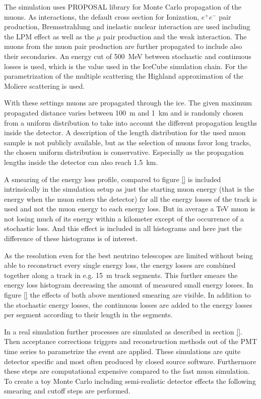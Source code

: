 The simulation uses PROPOSAL library for Monte Carlo propagation of the muons.
As interactions, the default cross section for Ionization, $e^+e^-$ pair production, Bremsstrahlung and inelastic nuclear interaction are used including the LPM effect as well as the $\mu$ pair production and the weak interaction.
The muons from the muon pair production are further propagated to include also their secondaries.
An energy cut of \SI{500}{MeV} between stochastic and continuous losses is used, which is the value used in the IceCube simulation chain.
For the parametrization of the multiple scattering the Highland approximation of the Moliere scattering is used.

With these settings muons are propagated through the ice.
The given maximum propagated distance varies between \SI{100}{m} and \SI{1}{km} and is randomly chosen from a uniform distribution to take into account the different propagation lengths inside the detector.
A description of the length distribution for the used muon sample is not publicly available, but as the selection of muons favor long tracks, the chosen uniform distribution is conservative.
Especially as the propagation lengths inside the detector can also reach \SI{1.5}{km}.

A smearing of the energy loss profile, compared to figure \ref{} is included intrinsically in the simulation setup as just the starting muon energy (that is the energy when the muon enters the detector) for all the energy losses of the track is used and not the muon energy to each energy loss.
But in average a TeV muon is not losing much of its energy within a kilometer except of the occurrence of a stochastic loss.
And this effect is included in all histograms and here just the difference of these histograms is of interest.

As the resolution even for the best neutrino telescopes are limited without being able to reconstruct every single energy loss, the energy losses are combined together along a track in e.g. \SI{15}{m} track segments.
This further smears the energy loss histogram decreasing the amount of measured small energy losses.
In figure \ref{} the effects of both above mentioned smearing are visible.
In addition to the stochastic energy losses, the continuous losses are added to the energy losses per segment according to their length in the segments.

In a real simulation further processes are simulated as described in section \ref{}.
Then acceptance corrections triggers and reconstruction methods out of the PMT time series to parametrize the event are applied.
These simulations are quite detector specific and most often produced by closed source software.
Furthermore these steps are computational expensive compared to the fast muon simulation.
To create a toy Monte Carlo including semi-realistic detector effects the following smearing and cutoff steps are performed.

